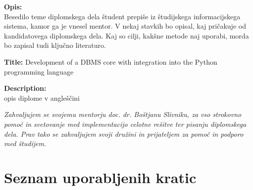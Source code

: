 \documentclass[a4paper,12pt,openright]{book}
\newcommand{\ttitleEn}{Development of a DBMS core with integration into the Python programming language}
\newcommand{\clearemptydoublepage}{\newpage{\pagestyle{empty}\cleardoublepage}}
\begin{document}
\bigskip
\noindent\textbf{Opis:}\\
Besedilo teme diplomskega dela študent prepiše iz študijskega informacijskega sistema, kamor ga je vnesel mentor. 
V nekaj stavkih bo opisal, kaj pričakuje od kandidatovega diplomskega dela. 
Kaj so cilji, kakšne metode naj uporabi, morda bo zapisal tudi ključno literaturo.

\bigskip
\noindent\textbf{Title:} \ttitleEn

\bigskip
\noindent\textbf{Description:}\\
opis diplome v angleščini

\vfill



\vspace{2cm}

\clearemptydoublepage

\thispagestyle{empty}\mbox{}\vfill\null\it%
\noindent
Zahvaljujem se svojemu mentorju doc. dr. Boštjanu Slivniku, za vso strokovno pomoč in svetovanje med implementacijo celotne rešitve ter pisanju diplomskega dela. Prav tako se zahvaljujem svoji družini in prijateljem za pomoč in podporo med študijem.
\rm\normalfont

\clearemptydoublepage


\clearemptydoublepage


\setcounter{tocdepth}{2}
\pagestyle{empty}
\def\thepage{}%
\tableofcontents{}


\clearemptydoublepage


\chapter*{Seznam uporabljenih kratic}
\end{document}
